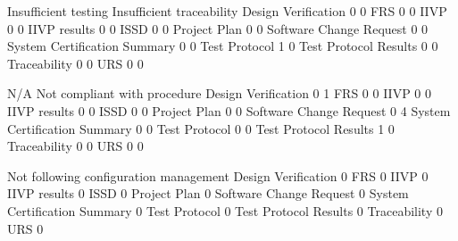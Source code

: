 \documentclass{article}
\begin{document}
\begin{Schunk}
\begin{Soutput}
                               Insufficient testing Insufficient traceability
  Design Verification                             0                         0
  FRS                                             0                         0
  IIVP                                            0                         0
  IIVP results                                    0                         0
  ISSD                                            0                         0
  Project Plan                                    0                         0
  Software Change Request                         0                         0
  System Certification Summary                    0                         0
  Test Protocol                                   1                         0
  Test Protocol Results                           0                         0
  Traceability                                    0                         0
  URS                                             0                         0
                              
                               N/A Not compliant with procedure
  Design Verification            0                            1
  FRS                            0                            0
  IIVP                           0                            0
  IIVP results                   0                            0
  ISSD                           0                            0
  Project Plan                   0                            0
  Software Change Request        0                            4
  System Certification Summary   0                            0
  Test Protocol                  0                            0
  Test Protocol Results          1                            0
  Traceability                   0                            0
  URS                            0                            0
                              
                               Not following configuration management
  Design Verification                                               0
  FRS                                                               0
  IIVP                                                              0
  IIVP results                                                      0
  ISSD                                                              0
  Project Plan                                                      0
  Software Change Request                                           0
  System Certification Summary                                      0
  Test Protocol                                                     0
  Test Protocol Results                                             0
  Traceability                                                      0
  URS                                                               0
                              

\end{Soutput}
\end{Schunk}
\end{document}
